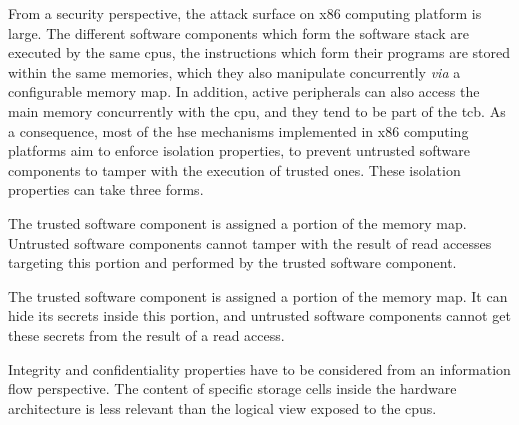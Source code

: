 From a security perspective, the attack surface on x86 computing platform is
large.  
%
The different software components which form the software stack are executed by
the same \acp{cpu}, the instructions which form their programs are stored within
the same memories, which they also manipulate concurrently \emph{via} a
configurable memory map.
%
In addition, active peripherals can also access the main memory concurrently
with the \ac{cpu}, and they tend to be part of the \ac{tcb}. 
%
As a consequence, most of the \ac{hse} mechanisms implemented in x86 computing
platforms aim to enforce isolation properties, to prevent untrusted software 
components to tamper with the execution of trusted ones.
%
These isolation properties can take three forms.

\begin{definition}[Integrity]
  \label{def:usecase:int}
  The trusted software component is assigned a portion of the memory map.
  Untrusted software components cannot tamper with the result of read accesses
  targeting this portion and performed by the trusted software component.
\end{definition}

\begin{definition}[Confidentiality]
  The trusted software component is assigned a portion of the memory map.
  It can hide its secrets inside this portion, and untrusted software components
  cannot get these secrets from the result of a read access.
\end{definition}

Integrity and confidentiality properties have to be considered from an
information flow perspective.
%
The content of specific storage cells inside the hardware architecture is less
relevant than the logical view exposed to the \acp{cpu}.  

